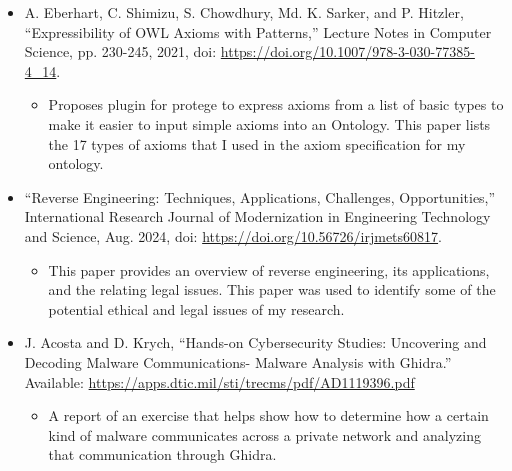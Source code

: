 \documentclass[12pt, a4paper]{article}
\begin{document}
    \begin{itemize}
        \item A. Eberhart, C. Shimizu, S. Chowdhury, Md. K. Sarker, and P. Hitzler, “Expressibility of OWL Axioms with Patterns,” 
        Lecture Notes in Computer Science, pp. 230-245, 2021, doi: \url{https://doi.org/10.1007/978-3-030-77385-4\_14}. 
        \begin{itemize}
            \item Proposes plugin for protege to express axioms from a list of basic types to make it easier to input simple axioms into an Ontology. 
            This paper lists the 17 types of axioms that I used in the axiom specification for my ontology. 
        \end{itemize}
    \end{itemize}
    \begin{itemize}
        \item “Reverse Engineering: Techniques, Applications, Challenges, Opportunities,” 
        International Research Journal of Modernization in Engineering Technology and Science, Aug. 2024, doi: \url{https://doi.org/10.56726/irjmets60817}. 
        \begin{itemize}
            \item This paper provides an overview of reverse engineering, its applications, and the relating legal issues. 
            This paper was used to identify some of the potential ethical and legal issues of my research.
        \end{itemize}
    \end{itemize}
    \begin{itemize}
        \item J. Acosta and D. Krych, “Hands-on Cybersecurity Studies: Uncovering and Decoding Malware Communications- Malware Analysis with Ghidra.” 
        Available: \url{https://apps.dtic.mil/sti/trecms/pdf/AD1119396.pdf }
        \begin{itemize}
            \item A report of an exercise that helps show how to determine how a certain kind of malware communicates across a private network 
            and analyzing that communication through Ghidra. 
        \end{itemize}
    \end{itemize}
\end{document}
